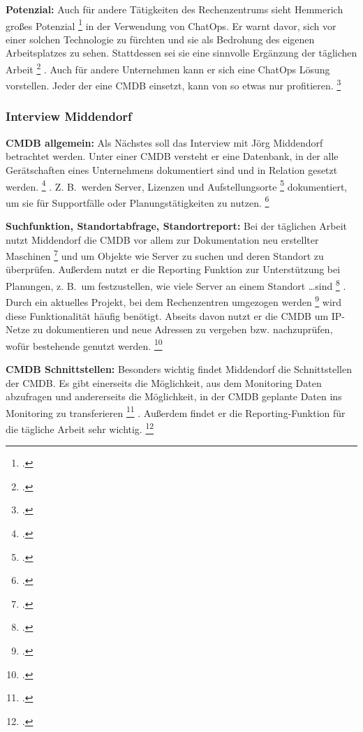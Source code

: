 \textbf{Potenzial: }Auch für andere Tätigkeiten des Rechenzentrums sieht Hemmerich \glqq{}großes Potenzial\grqq
\footcite[][o. \pno]{Hemm_2019}
 in der Verwendung von ChatOps.
 Er warnt davor, sich vor einer solchen Technologie zu fürchten und sie als Bedrohung des eigenen Arbeitsplatzes zu sehen. Stattdessen sei sie eine \glqq{}sinnvolle Ergänzung der täglichen Arbeit\grqq
\footcite[][o. \pno]{Hemm_2019}
. Auch für andere Unternehmen kann er sich eine ChatOps Lösung vorstellen. \glqq{}Jeder der eine CMDB einsetzt, kann von so etwas nur profitieren.\grqq
\footcites[][o. \pno]{Hemm_2019}[Vgl.][o. \pno]{Hemm_2019}



\subsubsection{Interview Middendorf}
\textbf{CMDB allgemein: }Als Nächstes soll das Interview mit Jörg Middendorf betrachtet werden. Unter einer \acs{CMDB} versteht er eine Datenbank, in der \glqq{}alle Gerätschaften eines Unternehmens dokumentiert sind und in Relation gesetzt werden\grqq.
\footcite[][o. \pno]{Midd_2019}
.
Z. B.~werden \glqq{}Server, Lizenzen und Aufstellungsorte\grqq
\footcite[][o. \pno]{Midd_2019}
 dokumentiert, um sie für Supportfälle oder Planungstätigkeiten zu nutzen.
\footcite[Vgl.][o. \pno]{Midd_2019}

\textbf{Suchfunktion, Standortabfrage, Standortreport: }Bei der täglichen Arbeit nutzt Middendorf die \acs{CMDB} vor allem zur \glqq{}Dokumentation neu erstellter Maschinen\grqq
\footcite[][o. \pno]{Midd_2019}
 und um Objekte wie Server zu suchen und deren Standort zu überprüfen. Außerdem nutzt er die Reporting Funktion zur Unterstützung bei Planungen, z. B.~um festzustellen, \glqq{}wie viele Server an einem Standort \ldots sind\grqq
\footcite[][o. \pno]{Midd_2019}
. Durch ein aktuelles \glqq{}Projekt, bei dem Rechenzentren umgezogen werden\grqq
\footcite[][o. \pno]{Midd_2019}
 wird diese Funktionalität häufig benötigt. Abseits davon nutzt er die \acs{CMDB} um IP-Netze zu dokumentieren und neue Adressen zu vergeben bzw. nachzuprüfen, wofür bestehende genutzt werden.
\footcite[Vgl.][o. \pno]{Midd_2019}

\textbf{CMDB Schnittstellen: }Besonders wichtig findet Middendorf die Schnittstellen der \acs{CMDB}. Es gibt einerseits die Möglichkeit, aus dem Monitoring Daten abzufragen und andererseits die Möglichkeit, in \glqq{}der CMDB geplante Daten ins Monitoring zu transferieren\grqq
\footcite[][o. \pno]{Midd_2019}
.
Außerdem findet er die Reporting-Funktion für die tägliche Arbeit sehr wichtig.
\footcite[Vgl.][o. \pno]{Midd_2019}

